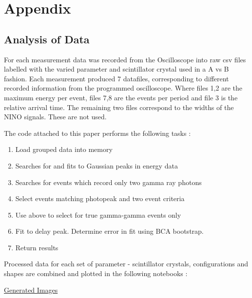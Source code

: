 \section*{Appendix}
\subsection{Analysis of Data}
For each measurement data was recorded from the Oscilloscope into raw csv files labelled with the varied parameter and scintillator crystal used in a A vs B fashion. Each measurement produced 7 datafiles, corresponding to different recorded information from the programmed oscilloscope. Where files 1,2 are the maximum energy per event, files 7,8 are the events per period and file 3 is the relative arrival time. The remaining two files correspond to the widths of the NINO signals. These are not used.

The code attached to this paper performs the following tasks : 

\begin{enumerate}
\item Load grouped data into memory
\item Searches for and fits to Gaussian peaks in energy data
\item Searches for events which record only two gamma ray photons
\item Select events matching photopeak and two event criteria
\item Use above to select for true gamma-gamma events only
\item Fit to delay peak. Determine error in fit using BCA bootstrap.
\item Return results
\end{enumerate}

Processed data for each set of parameter - scintillator crystals, configurations and shapes are combined and plotted in the following notebooks :

\href{http://nbviewer.ipython.org/github/marksbrown/doipaper/blob/master/notebooks/Generate%20Images.ipynb}{Generated Images}